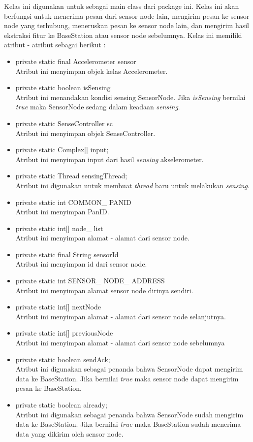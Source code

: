 Kelas ini digunakan untuk sebagai main class dari package ini. Kelas ini akan berfungsi untuk menerima pesan dari sensor node lain, mengirim pesan ke sensor node yang terhubung, meneruskan pesan ke sensor node lain, dan mengirim hasil ekstraksi fitur ke BaseStation atau sensor node sebelumnya. Kelas ini memiliki atribut - atribut sebagai berikut :
\begin{itemize}
	\item private static final Accelerometer sensor  \\
		Atribut ini menyimpan objek kelas Accelerometer.
	\item private static boolean isSensing \\
		Atribut ini menandakan kondisi sensing SensorNode. Jika {\it isSensing} bernilai {\it true} maka SensorNode sedang dalam keadaan {\it sensing}. 
	\item private static SenseController sc\\
		Atribut ini menyimpan objek SenseController.
	\item private static Complex[] input; \\
		Atribut ini menyimpan input dari hasil {\it sensing} akselerometer.
	\item private static Thread sensingThread;\\
		Atribut ini digunakan untuk membuat {\it thread} baru untuk melakukan {\it sensing}.
	\item private static int COMMON\_ PANID \\
		Atribut ini menyimpan PanID.
	\item private static int[] node\_ list \\
		Atribut ini menyimpan alamat - alamat dari sensor node.
	\item private static final String sensorId \\
		Atribut ini menyimpan id dari sensor node.
	\item private static int SENSOR\_ NODE\_ ADDRESS \\
		Atribut ini menyimpan alamat sensor node dirinya sendiri.
	\item private static int[] nextNode \\
		Atribut ini menyimpan alamat - alamat dari sensor node selanjutnya.
	\item private static int[] previousNode \\
		Atribut ini menyimpan alamat - alamat dari sensor node sebelumnya
	\item private static boolean sendAck;\\
		Atribut ini digunakan sebagai penanda bahwa SensorNode dapat mengirim data ke BaseStation. Jika bernilai {\it true} maka sensor node dapat mengirim pesan ke BaseStation.
	\item private static boolean already; \\
		Atribut ini digunakan sebagai penanda bahwa SensorNode sudah mengirim data ke BaseStation. Jika bernilai {\it true} maka BaseStation sudah menerima data yang dikirim oleh sensor node.
\end{itemize}
